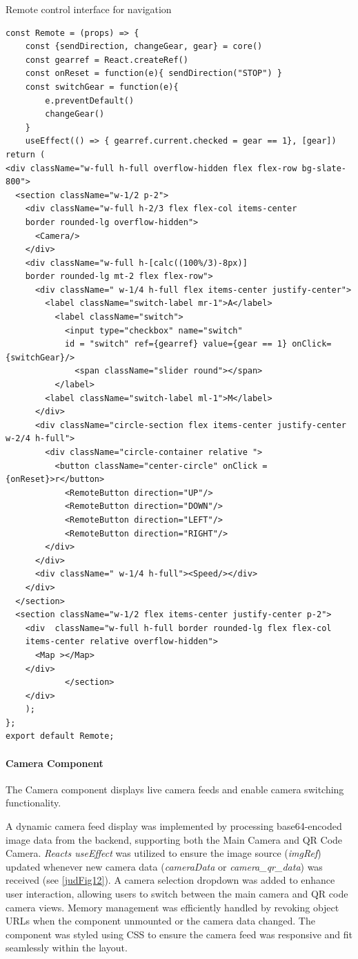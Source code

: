 \documentclass[../../main]{subfiles}
\begin{document}
\begin{codebox}[]{Remote control interface for navigation}
  \begin{verbatim}
const Remote = (props) => {
    const {sendDirection, changeGear, gear} = core()
    const gearref = React.createRef()
    const onReset = function(e){ sendDirection("STOP") }
    const switchGear = function(e){
        e.preventDefault()
        changeGear()
    }
    useEffect(() => { gearref.current.checked = gear == 1}, [gear])
return (
<div className="w-full h-full overflow-hidden flex flex-row bg-slate-800">
  <section className="w-1/2 p-2">
    <div className="w-full h-2/3 flex flex-col items-center  
    border rounded-lg overflow-hidden">
      <Camera/>
    </div>
    <div className="w-full h-[calc((100%/3)-8px)] 
    border rounded-lg mt-2 flex flex-row">
      <div className=" w-1/4 h-full flex items-center justify-center">
        <label className="switch-label mr-1">A</label>
          <label className="switch">
            <input type="checkbox" name="switch" 
            id = "switch" ref={gearref} value={gear == 1} onClick={switchGear}/>
              <span className="slider round"></span>
          </label>
        <label className="switch-label ml-1">M</label>
      </div>
      <div className="circle-section flex items-center justify-center  w-2/4 h-full">
        <div className="circle-container relative ">
          <button className="center-circle" onClick = {onReset}>r</button>
            <RemoteButton direction="UP"/>
            <RemoteButton direction="DOWN"/>
            <RemoteButton direction="LEFT"/>
            <RemoteButton direction="RIGHT"/>
        </div>
      </div>
      <div className=" w-1/4 h-full"><Speed/></div>
    </div>
  </section>
  <section className="w-1/2 flex items-center justify-center p-2">
    <div  className="w-full h-full border rounded-lg flex flex-col 
    items-center relative overflow-hidden">
      <Map ></Map>
    </div>
            </section>
    </div>
    );
};
export default Remote;
\end{verbatim}
\end{codebox}


\paragraph{Camera Component}

The Camera component displays live camera feeds and enable camera
switching functionality.

A dynamic camera feed display was implemented by processing
base64-encoded image data from the backend, supporting both the Main
Camera and QR Code Camera. \emph{React\textquotesingle s useEffect} was
utilized to ensure the image source (\emph{imgRef}) updated whenever new
camera data (\emph{cameraData} or \emph{camera\_qr\_data}) was received
(see \cref{judFig12}). A camera selection dropdown was added to enhance user
interaction, allowing users to switch between the main camera and QR
code camera views. Memory management was efficiently handled by revoking
object URLs when the component unmounted or the camera data changed. The
component was styled using CSS to ensure the camera feed was responsive
and fit seamlessly within the layout.
\end{document}
